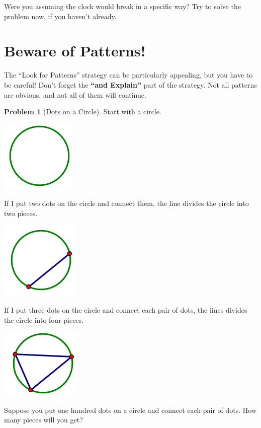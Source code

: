 \documentclass[10pt, reqno]{amsart}
\theoremstyle{remark}
\theoremstyle{definition}
\newtheorem{problem}{Problem}
\numberwithin{equation}{section}  %
\begin{document}
Were you assuming the clock would break in a specific way?  Try to solve the problem now, if you haven't already.  


\section{Beware of Patterns!}\label{sec:BewarePatterns}

The ``Look for Patterns'' strategy can be particularly appealing, but you have to be careful!  Don't forget the {\bf ``and Explain''} part of the strategy.  Not all patterns are obvious, and not all of them will continue.

\begin{problem}[Dots on a Circle]
Start with a circle.  
\begin{center}
\includegraphics[height=3 cm]{circle}
\end{center}
If I put two dots on the circle and connect them, the line divides the circle into two pieces.
\begin{center}
\includegraphics[height=3 cm]{twodots}
\end{center}
If I put three dots on the circle and connect each pair of dots, the lines divides the circle into four pieces.
\begin{center}
\includegraphics[height=3 cm]{threedots}
\end{center}
Suppose you put one hundred dots on a circle and connect each pair of dots.  How many pieces will you get? 
\end{problem}
\end{document}
